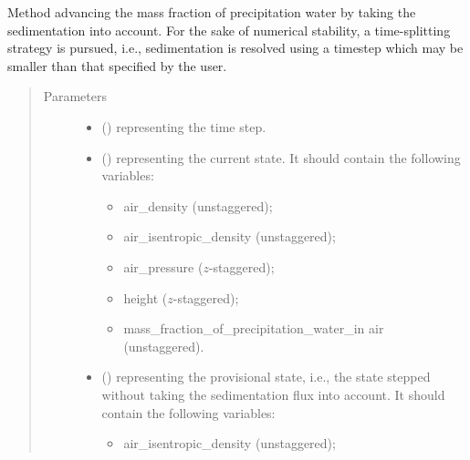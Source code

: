 \documentclass[letterpaper,10pt,english]{sphinxmanual}
\begin{document}
\begin{fulllineitems}
\begin{fulllineitems}
\label{\detokenize{api:dycore.prognostic_isentropic_forward_euler.PrognosticIsentropicForwardEuler.step_integrating_sedimentation_flux}}
Method advancing the mass fraction of precipitation water by taking the sedimentation into account.
For the sake of numerical stability, a time-splitting strategy is pursued, i.e., sedimentation is resolved
using a timestep which may be smaller than that specified by the user.
\begin{quote}\begin{description}
\item[{Parameters}] \leavevmode\begin{itemize}
\item {} 
 () \textendash{}  representing the time step.

\item {} 
 () \textendash{} 
 representing the current state.
It should contain the following variables:
\begin{itemize}
\item {} 
air\_density (unstaggered);

\item {} 
air\_isentropic\_density (unstaggered);

\item {} 
air\_pressure (\(z\)-staggered);

\item {} 
height (\(z\)-staggered);

\item {} 
mass\_fraction\_of\_precipitation\_water\_in air (unstaggered).

\end{itemize}


\item {} 
 () \textendash{} 
 representing the provisional state, i.e.,
the state stepped without taking the sedimentation flux into account.
It should contain the following variables:
\begin{itemize}
\item {} 
air\_isentropic\_density (unstaggered);


\end{itemize}
\end{itemize}
\end{description}
\end{quote}
\end{fulllineitems}
\end{fulllineitems}
\end{document}
